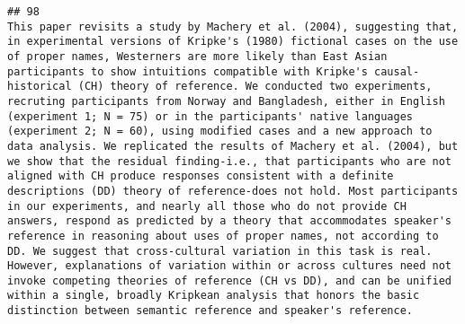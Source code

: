 \documentclass[
  english,
  man]{apa6}
\begin{document}
\begin{verbatim}
## 98                                                                                                                                                                                                                                                                                                                                                                                                                                                                                                                                                                                                                                                                                                                                                                                                                                                                                                                                                                                                                                                                                                                                                                                                                                                                            This paper revisits a study by Machery et al. (2004), suggesting that, in experimental versions of Kripke's (1980) fictional cases on the use of proper names, Westerners are more likely than East Asian participants to show intuitions compatible with Kripke's causal-historical (CH) theory of reference. We conducted two experiments, recruting participants from Norway and Bangladesh, either in English (experiment 1; N = 75) or in the participants' native languages (experiment 2; N = 60), using modified cases and a new approach to data analysis. We replicated the results of Machery et al. (2004), but we show that the residual finding-i.e., that participants who are not aligned with CH produce responses consistent with a definite descriptions (DD) theory of reference-does not hold. Most participants in our experiments, and nearly all those who do not provide CH answers, respond as predicted by a theory that accommodates speaker's reference in reasoning about uses of proper names, not according to DD. We suggest that cross-cultural variation in this task is real. However, explanations of variation within or across cultures need not invoke competing theories of reference (CH vs DD), and can be unified within a single, broadly Kripkean analysis that honors the basic distinction between semantic reference and speaker's reference.

\end{verbatim}
\end{document}
